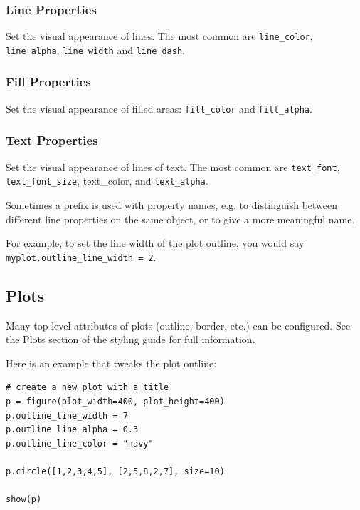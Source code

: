 \documentclass[a4paper,12pt]{article}
\begin{document}
\subsubsection{Line Properties}
Set the visual appearance of lines. The most common are \texttt{line\_color}, \texttt{line\_alpha}, \texttt{line\_width} and \texttt{line\_dash}.

\subsubsection{Fill Properties}
Set the visual appearance of filled areas: \texttt{fill\_color} and \texttt{fill\_alpha}.

\subsubsection{Text Properties}
Set the visual appearance of lines of text. The most common are \texttt{text\_font}, \texttt{text\_font\_size}, text\_color, and \texttt{text\_alpha}.

Sometimes a prefix is used with property names, e.g. to distinguish between different line properties on the same object, or to give a more meaningful name. 

For example, to set the line width of the plot outline, you would say \texttt{myplot.outline\_line\_width = 2}.
\subsection{Plots}
Many top-level attributes of plots (outline, border, etc.) can be configured. See the Plots section of the styling guide for full information.

Here is an example that tweaks the plot outline:

\begin{framed}
\begin{verbatim}
# create a new plot with a title
p = figure(plot_width=400, plot_height=400)
p.outline_line_width = 7
p.outline_line_alpha = 0.3
p.outline_line_color = "navy"

p.circle([1,2,3,4,5], [2,5,8,2,7], size=10)

show(p)
	
\end{verbatim}
\end{framed}
\end{document}
